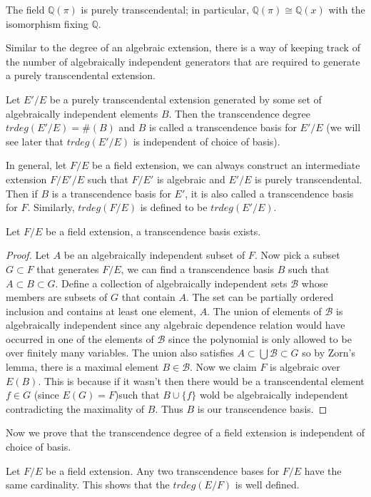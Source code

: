 \begin{example} The field $\mathbb{Q}(\pi)$ is purely transcendental; in
particular, $\mathbb{Q}(\pi)\cong\mathbb{Q}(x)$ with the isomorphism fixing
$\mathbb{Q}$. \end{example}
Similar to the degree of an algebraic extension, there is a way of keeping
track of the number of algebraically independent generators that are required to
generate a purely transcendental extension.
\begin{definition} Let $E'/E$ be a purely transcendental extension generated by
some set of algebraically independent elements $B$. Then the transcendence
degree $trdeg(E'/E)=\#(B)$ and $B$ is called a transcendence basis for $E'/E$
(we will see later that $trdeg(E'/E)$ is independent of choice of basis).
\end{definition}
In general, let $F/E$ be a field extension, we can always construct an
intermediate extension $F/E'/E$ such that $F/E'$ is algebraic and $E'/E$ is
purely transcendental. Then if $B$ is a transcendence basis for $E'$, it is
also called a transcendence basis for $F$. Similarly, $trdeg(F/E)$ is defined to
be
$trdeg(E'/E)$.
\begin{theorem} Let $F/E$ be a field extension, a transcendence basis exists.
\end{theorem}
\begin{proof} Let $A$ be an algebraically independent subset of $F$. Now pick a
subset $G\subset F$ that generates $F/E$, we can find a transcendence basis
$B$ such that $A\subset B\subset G$. Define a collection of algebraically
independent sets $\mathcal{B}$ whose members are subsets of $G$ that contain
$A$. The set can be partially ordered inclusion and contains at least one
element, $A$. The union of elements of $\mathcal{B}$ is algebraically
independent since any algebraic dependence relation would have occurred in one
of the elements of $\mathcal{B}$ since the polynomial is only allowed to be over
finitely many variables. The union also satisfies $A\subset
\bigcup\mathcal{B}\subset G$ so by Zorn's lemma, there is a maximal element
$B\in\mathcal{B}$. Now we claim $F$ is algebraic over $E(B)$. This is because
if it wasn't then there would be a transcendental element $f\in G$ (since
$E(G)=F$)such that $B\cup\{f\}$ wold be algebraically independent contradicting
the
maximality of $B$. Thus $B$ is our transcendence basis. \end{proof}
Now we prove that the transcendence degree of a field extension is independent
of choice of basis.
\begin{theorem} Let $F/E$ be a field extension. Any two transcendence bases for
$F/E$ have the same cardinality. This shows that the $trdeg(E/F)$ is well
defined. \end{theorem}
